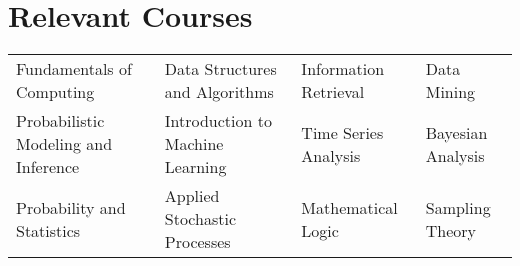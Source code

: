 \section*{\sc Relevant Courses}
\vspace{-2mm}
\hrulefill
\vspace{1mm}

\begin{tabular}{ l l l l }
    Fundamentals of Computing & Data Structures and Algorithms & Information Retrieval & Data Mining \\
    Probabilistic Modeling and Inference & Introduction to Machine Learning & Time Series Analysis& Bayesian Analysis\\
    Probability and Statistics & Applied Stochastic Processes & Mathematical Logic & Sampling Theory \\
\end{tabular}

